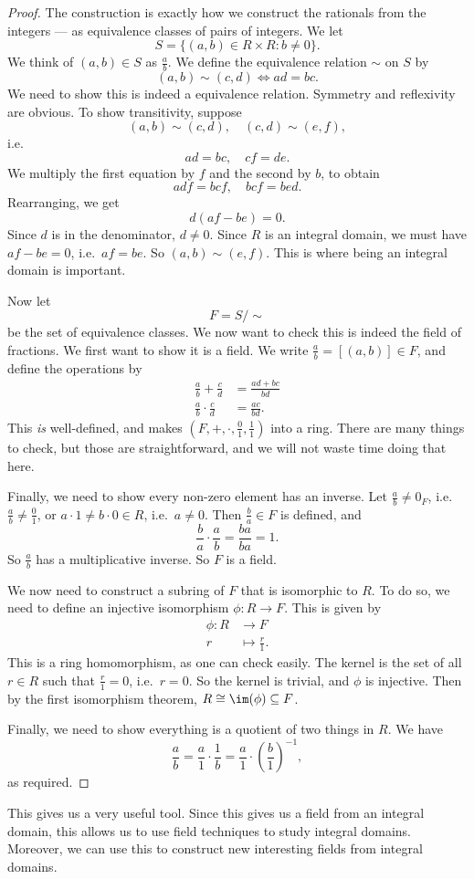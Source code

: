 \documentclass[a4paper]{article}
\begin{document}
\begin{proof}
  The construction is exactly how we construct the rationals from the integers --- as equivalence classes of pairs of integers. We let
  \[
    S = \{(a, b) \in R \times R: b \not= 0\}.
  \]
  We think of $(a, b) \in S$ as $\frac{a}{b}$. We define the equivalence relation $\sim$ on $S$ by
  \[
    (a, b) \sim (c, d) \Leftrightarrow ad = bc.
  \]
  We need to show this is indeed a equivalence relation. Symmetry and reflexivity are obvious. To show transitivity, suppose
  \[
    (a, b) \sim (c, d),\quad (c, d) \sim (e, f),
  \]
  i.e.
  \[
    ad = bc,\quad cf = de.
  \]
  We multiply the first equation by $f$ and the second by $b$, to obtain
  \[
    adf = bcf,\quad bcf = bed.
  \]
  Rearranging, we get
  \[
    d(af - be) = 0.
  \]
  Since $d$ is in the denominator, $d \not= 0$. Since $R$ is an integral domain, we must have $af - be = 0$, i.e.\ $af = be$. So $(a, b) \sim (e, f)$. This is where being an integral domain is important.

  Now let
  \[
    F = S/{\sim}
  \]
  be the set of equivalence classes. We now want to check this is indeed the field of fractions. We first want to show it is a field. We write $\frac{a}{b} = [(a, b)] \in F$, and define the operations by
  \begin{align*}
    \frac{a}{b} + \frac{c}{d} &= \frac{ad + bc}{bd}\\
    \frac{a}{b}\cdot \frac{c}{d} &= \frac{ac}{bd}.
  \end{align*}
  This \emph{is} well-defined, and makes $(F, +, \cdot, \frac{0}{1}, \frac{1}{1})$ into a ring. There are many things to check, but those are straightforward, and we will not waste time doing that here.

  Finally, we need to show every non-zero element has an inverse. Let $\frac{a}{b} \not= 0_F$, i.e.\ $\frac{a}{b} \not= \frac{0}{1}$, or $a\cdot 1 \not= b \cdot 0 \in R$, i.e.\ $a \not= 0$. Then $\frac{b}{a} \in F$ is defined, and
  \[
    \frac{b}{a} \cdot \frac{a}{b} = \frac{ba}{ba} = 1.
  \]
  So $\frac{a}{b}$ has a multiplicative inverse. So $F$ is a field.

  We now need to construct a subring of $F$ that is isomorphic to $R$. To do so, we need to define an injective isomorphism $\phi: R \to F$. This is given by
  \begin{align*}
    \phi: R &\to F\\
    r &\mapsto \frac{r}{1}.
  \end{align*}
  This is a ring homomorphism, as one can check easily. The kernel is the set of all $r \in R$ such that $\frac{r}{1} = 0$, i.e.\ $r = 0$. So the kernel is trivial, and $\phi$ is injective. Then by the first isomorphism theorem, $R \cong \im(\phi) \subseteq F$.

  Finally, we need to show everything is a quotient of two things in $R$. We have
  \[
    \frac{a}{b} = \frac{a}{1} \cdot \frac{1}{b} = \frac{a}{1}\cdot \left(\frac{b}{1}\right)^{-1},
  \]
  as required.
\end{proof}
This gives us a very useful tool. Since this gives us a field from an integral domain, this allows us to use field techniques to study integral domains. Moreover, we can use this to construct new interesting fields from integral domains.
\end{document}
